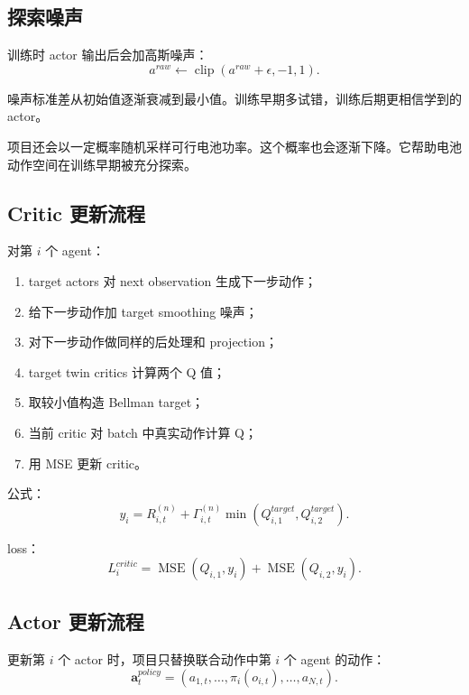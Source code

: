 \documentclass[UTF8,zihao=-4]{ctexart}
\begin{document}
\subsection{探索噪声}

训练时 actor 输出后会加高斯噪声：
\begin{equation}
a^{raw}
\leftarrow
\operatorname{clip}(a^{raw}+\epsilon,-1,1).
\end{equation}

噪声标准差从初始值逐渐衰减到最小值。训练早期多试错，训练后期更相信学到的 actor。

项目还会以一定概率随机采样可行电池功率。这个概率也会逐渐下降。它帮助电池动作空间在训练早期被充分探索。

\subsection{Critic 更新流程}

对第 $i$ 个 agent：
\begin{enumerate}
  \item target actors 对 next observation 生成下一步动作；
  \item 给下一步动作加 target smoothing 噪声；
  \item 对下一步动作做同样的后处理和 projection；
  \item target twin critics 计算两个 Q 值；
  \item 取较小值构造 Bellman target；
  \item 当前 critic 对 batch 中真实动作计算 Q；
  \item 用 MSE 更新 critic。
\end{enumerate}

公式：
\begin{equation}
y_i
=
R^{(n)}_{i,t}
+
\Gamma^{(n)}_{i,t}
\min(Q^{target}_{i,1},Q^{target}_{i,2}).
\end{equation}

loss：
\begin{equation}
L^{critic}_i
=
\operatorname{MSE}(Q_{i,1},y_i)
+
\operatorname{MSE}(Q_{i,2},y_i).
\end{equation}

\subsection{Actor 更新流程}

更新第 $i$ 个 actor 时，项目只替换联合动作中第 $i$ 个 agent 的动作：
\begin{equation}
\bm{a}^{policy}_t
=
(a_{1,t},\dots,\pi_i(o_{i,t}),\dots,a_{N,t}).
\end{equation}
\end{document}
